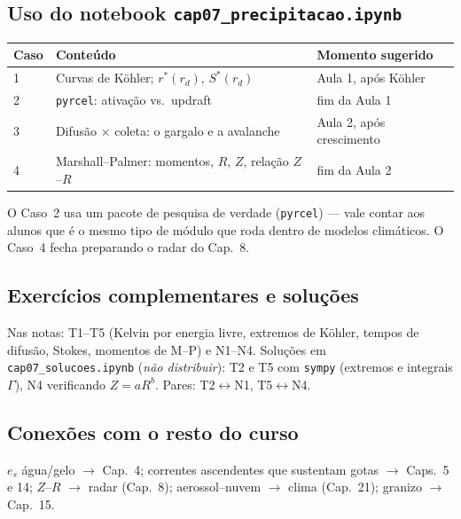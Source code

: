 \subsection*{Uso do notebook \texttt{cap07\_precipitacao.ipynb}}

\begin{center}
\begin{tabular}{lll}
\hline
Caso & Conteúdo & Momento sugerido \\
\hline
1 & Curvas de Köhler; $r^*(r_d)$, $S^*(r_d)$ & Aula 1, após Köhler \\
2 & \texttt{pyrcel}: ativação vs.\ updraft & fim da Aula 1 \\
3 & Difusão × coleta: o gargalo e a avalanche & Aula 2, após crescimento \\
4 & Marshall--Palmer: momentos, $R$, $Z$, relação $Z$--$R$ & fim da Aula 2 \\
\hline
\end{tabular}
\end{center}

O Caso~2 usa um pacote de pesquisa de verdade (\texttt{pyrcel}) — vale
contar aos alunos que é o mesmo tipo de módulo que roda dentro de modelos
climáticos. O Caso~4 fecha preparando o radar do Cap.~8.

\subsection*{Exercícios complementares e soluções}

Nas notas: T1--T5 (Kelvin por energia livre, extremos de Köhler, tempos de
difusão, Stokes, momentos de M--P) e N1--N4. Soluções em
\texttt{cap07\_solucoes.ipynb} (\emph{não distribuir}): T2 e T5 com
\texttt{sympy} (extremos e integrais $\Gamma$), N4 verificando $Z = aR^b$.
Pares: T2$\leftrightarrow$N1, T5$\leftrightarrow$N4.

\subsection*{Conexões com o resto do curso}

$e_s$ água/gelo $\to$ Cap.~4; correntes ascendentes que sustentam gotas
$\to$ Caps.~5 e 14; $Z$--$R$ $\to$ radar (Cap.~8); aerossol--nuvem $\to$
clima (Cap.~21); granizo $\to$ Cap.~15.
